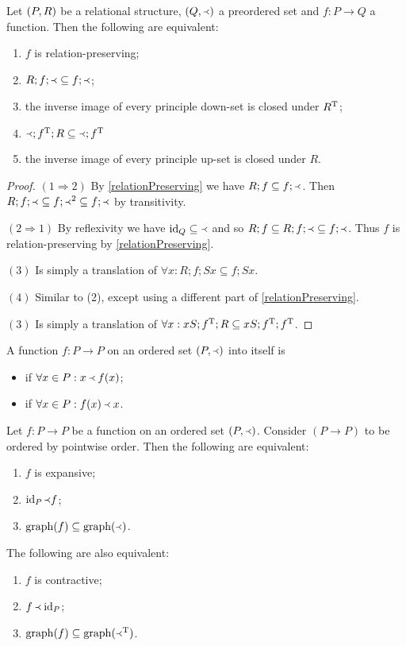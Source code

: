 \begin{proposition}
Let $\left( P,R \right)$ be a relational structure, $\left( Q,\Yleft \right)$ a preordered set and $f:P\to Q$ a function. Then the following are equivalent:
\begin{enumerate}
\item $f$ is relation-preserving;
\item $R;f;\Yleft \subseteq f;\Yleft$;
\item the inverse image of every principle down-set is closed under $R^{\mathrm{T}}$;
\item $\Yleft;f^{\mathrm{T}}; R \subseteq \Yleft;f^{\mathrm{T}}$
\item the inverse image of every principle up-set is closed under $R$.
\end{enumerate}
\end{proposition}
\begin{proof}
$(1 \Rightarrow 2)$ By \ref{relationPreserving} we have $R;f \subseteq f;\Yleft$. Then $R;f;\Yleft \subseteq f;\Yleft^2 \subseteq f;\Yleft$ by transitivity.

$(2 \Rightarrow 1)$ By reflexivity we have $\operatorname{id}_Q \subseteq \Yleft$ and so $R;f \subseteq R;f;\Yleft \subseteq f;\Yleft$. Thus $f$ is relation-preserving by \ref{relationPreserving}.

$(3)$ Is simply a translation of $\forall x: R;f;Sx \subseteq f;Sx$.

$(4)$ Similar to (2), except using a different part of \ref{relationPreserving}.

$(3)$ Is simply a translation of $\forall x: xS;f^{\mathrm{T}}; R \subseteq xS;f^{\mathrm{T}};f^{\mathrm{T}}$.
\end{proof}


\begin{definition}
A function $f: P\to P$ on an ordered set $(P,\Yleft)$ into itself is
\begin{itemize}
\item {} if $\forall x\in P: x\Yleft f(x)$;
\item {} if $\forall x\in P: f(x)\Yleft x$.
\end{itemize}
\end{definition}

\begin{lemma}
Let $f:P\to P$ be a function on an ordered set $(P,\Yleft)$. Consider $(P\to P)$ to be ordered by pointwise order. Then the following are equivalent:
\begin{enumerate}
\item $f$ is expansive;
\item $\operatorname{id}_P \Yleft f$;
\item $\operatorname{graph}(f) \subseteq \operatorname{graph}(\Yleft)$.
\end{enumerate}
The following are also equivalent:
\begin{enumerate}
\item $f$ is contractive;
\item $f \Yleft \operatorname{id}_P$;
\item $\operatorname{graph}(f) \subseteq \operatorname{graph}(\Yleft^{\mathrm{T}})$.
\end{enumerate}
\end{lemma}

